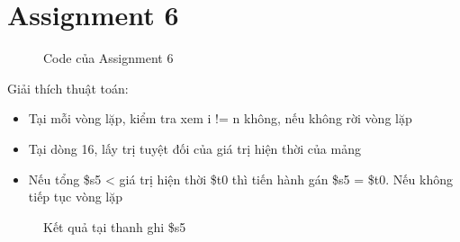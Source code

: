 \documentclass[a4paper,12pt]{article}
\begin{document}
\section{Assignment 6}
\begin{figure}[!h]
	\centerline{}
	\caption{Code của Assignment 6}
	\label{fig:ass6}
\end{figure}
\noindent
Giải thích thuật toán: 
\begin{itemize}
	\item Tại mỗi vòng lặp, kiểm tra xem i != n không, nếu không rời vòng lặp
	\item Tại dòng 16, lấy trị tuyệt đối của giá trị hiện thời của mảng
	\item Nếu tổng \$s5 < giá trị hiện thời \$t0  thì tiến hành gán \$s5 = \$t0. Nếu không tiếp tục vòng lặp
\end{itemize}
\begin{figure}[!h]
	\centerline{}
	\caption{Kết quả tại thanh ghi \$s5}
	\label{fig:ass6a}
\end{figure}
\end{document}

